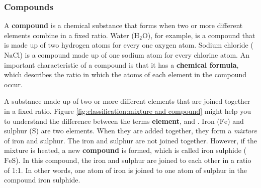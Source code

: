            \subsubsection{ Compounds}
            \nopagebreak
        \label{m38708*id63363}A \textbf{compound} is a chemical substance that forms when two or more different elements combine in a fixed ratio. Water ($\mathrm{H}{}_{2}\mathrm{O}$), for example, is a compound that is made up of two hydrogen atoms for every one oxygen atom. Sodium chloride ($\mathrm{NaCl}$) is a compound made up of one sodium atom for every chlorine atom. An important characteristic of a compound is that it has a \textbf{chemical formula}, which describes the ratio in which the atoms of each element in the compound occur.\par 
\label{m38708*fhsst!!!underscore!!!id201}
 { \label{m38708*meaningfhsst!!!underscore!!!id201}
        A substance made up of two or more different elements that are joined together in a fixed ratio.
         } 
        \label{m38708*id63410} Figure \ref{fig:classification:mixture and compound} might help you to understand the difference between the terms \textbf{element},  and . Iron ($\mathrm{Fe}$) and sulphur ($\mathrm{S}$) are two elements. When they are added together, they form a \textsl{mixture} of iron and sulphur. The iron and sulphur are not joined together. However, if the mixture is heated, a new \textbf{compound} is formed, which is called iron sulphide ($\mathrm{FeS}$). In this compound, the iron and sulphur are joined to each other in a ratio of 1:1. In other words, one atom of iron is joined to one atom of sulphur in the compound iron sulphide.\par 
    \setcounter{subfigure}{0}
